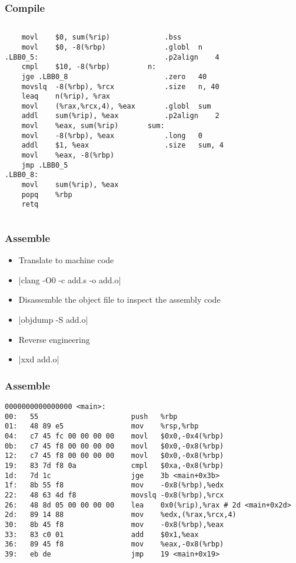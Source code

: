 \begin{frame}[fragile]
    \frametitle{Compile}
    \begin{columns}
    \begin{verbatim}
    movl	$0, sum(%rip)
    movl	$0, -8(%rbp)
.LBB0_5:
    cmpl	$10, -8(%rbp)
    jge	.LBB0_8
    movslq	-8(%rbp), %rcx
    leaq	n(%rip), %rax
    movl	(%rax,%rcx,4), %eax
    addl	sum(%rip), %eax
    movl	%eax, sum(%rip)
    movl	-8(%rbp), %eax
    addl	$1, %eax
    movl	%eax, -8(%rbp)
    jmp	.LBB0_5
.LBB0_8:
    movl	sum(%rip), %eax
    popq	%rbp
    retq
    \end{verbatim}
    \begin{verbatim}
    .bss
    .globl	n
    .p2align	4
n:
    .zero	40
    .size	n, 40

    .globl	sum
    .p2align	2
sum:
    .long	0
    .size	sum, 4
    \end{verbatim}

\end{columns}
\end{frame}

\begin{frame}
    \frametitle{Assemble}
    \begin{itemize}
        \item Translate to machine code
        \item {}|clang -O0 -c add.s -o add.o|
        \item Disassemble the object file to inspect the assembly code
        \item {}|objdump -S add.o| 
        \item Reverse engineering
        \item {}|xxd add.o|
    \end{itemize}
\end{frame}

\begin{frame}[fragile]
    \frametitle{Assemble}
    \begin{verbatim}
0000000000000000 <main>:
00:   55                      push   %rbp
01:   48 89 e5                mov    %rsp,%rbp
04:   c7 45 fc 00 00 00 00    movl   $0x0,-0x4(%rbp)
0b:   c7 45 f8 00 00 00 00    movl   $0x0,-0x8(%rbp)
12:   c7 45 f8 00 00 00 00    movl   $0x0,-0x8(%rbp)
19:   83 7d f8 0a             cmpl   $0xa,-0x8(%rbp)
1d:   7d 1c                   jge    3b <main+0x3b>
1f:   8b 55 f8                mov    -0x8(%rbp),%edx
22:   48 63 4d f8             movslq -0x8(%rbp),%rcx
26:   48 8d 05 00 00 00 00    lea    0x0(%rip),%rax # 2d <main+0x2d>
2d:   89 14 88                mov    %edx,(%rax,%rcx,4)
30:   8b 45 f8                mov    -0x8(%rbp),%eax
33:   83 c0 01                add    $0x1,%eax
36:   89 45 f8                mov    %eax,-0x8(%rbp)
39:   eb de                   jmp    19 <main+0x19>
    \end{verbatim}

\end{frame}


